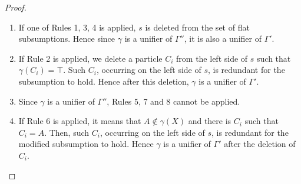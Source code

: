 \documentclass{article}
\begin{document}
\begin{proof}
	\begin{enumerate}
		\item If one of Rules 1, 3, 4 is applied, $s$ is deleted from the set of flat subsumptions. Hence since $\gamma$ is a unifier of $\Gamma''$, it is also a unifier of  $\Gamma'$. 
		\item If Rule 2 is applied, we delete a particle $C_i$ from the left side of $s$ such that $\gamma(C_i) = \top$. Such $C_i$, occurring on the left side of $s$, is redundant for the  subsumption to hold. Hence after this deletion, $\gamma$ is a unifier of $\Gamma'$.
		\item %
		Since $\gamma$ is a unifier of $\Gamma''$, Rules 5, 7 and 8 cannot be applied.
		\item If Rule 6 is applied, it means that $A \not\in \gamma(X)$ and there is $C_i$ such that $C_i = A$. Then, such $C_i$, occurring on the left side of $s$, is redundant for the modified subsumption to hold. Hence $\gamma$ is a unifier of $\Gamma'$ after the deletion of $C_i$.

\end{enumerate}
\end{proof}
\end{document}
